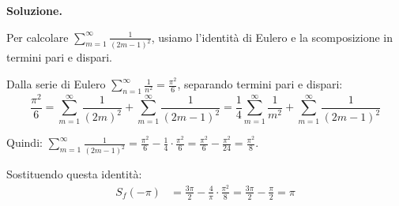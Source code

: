 \documentclass[12pt, a4paper]{article}
\newenvironment{solution}{%
    \par\noindent\textbf{Soluzione.}\medskip\par
    \normalfont
}{\par\bigskip}
\begin{document}
\begin{solution}
\begin{enumerate}
    Per calcolare $\sum_{m=1}^{\infty} \frac{1}{(2m-1)^2}$, usiamo l'identità di Eulero e la scomposizione in termini pari e dispari.
    
    Dalla serie di Eulero $\sum_{n=1}^{\infty} \frac{1}{n^2} = \frac{\pi^2}{6}$, separando termini pari e dispari:
    \[\frac{\pi^2}{6} = \sum_{m=1}^{\infty} \frac{1}{(2m)^2} + \sum_{m=1}^{\infty} \frac{1}{(2m-1)^2} = \frac{1}{4}\sum_{m=1}^{\infty} \frac{1}{m^2} + \sum_{m=1}^{\infty} \frac{1}{(2m-1)^2}\]
    
    Quindi: $\sum_{m=1}^{\infty} \frac{1}{(2m-1)^2} = \frac{\pi^2}{6} - \frac{1}{4} \cdot \frac{\pi^2}{6} = \frac{\pi^2}{6} - \frac{\pi^2}{24} = \frac{\pi^2}{8}$.
    
    Sostituendo questa identità:
    \begin{align}
        S_f(-\pi) &= \frac{3\pi}{2} - \frac{4}{\pi} \cdot \frac{\pi^2}{8} = \frac{3\pi}{2} - \frac{\pi}{2} = \pi
    \end{align}
\end{enumerate}
\end{solution}
\end{document}
